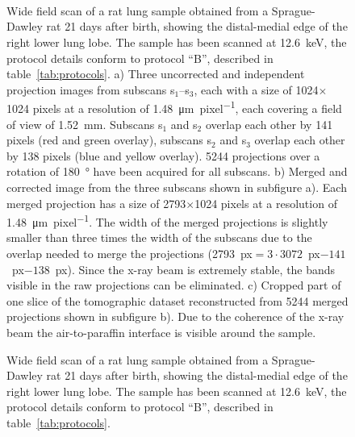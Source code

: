 \ifiucr
	\begin{figure}%
		\caption{Wide field scan of a rat lung sample obtained from a Sprague-Dawley rat 21 days after birth, showing the distal-medial edge of the right lower lung lobe. The sample has been scanned at \SI{12.6}{\kilo\electronvolt}, the protocol details conform to protocol ``B'', described in table~\ref{tab:protocols}. %
		a) Three uncorrected and independent projection images from subscans s$_1$--s$_3$, each with a size of 1024\(\times\)1024 pixels at a resolution of \SI{1.48}{\micro\meter\per pixel}, each covering a field of view of \SI{1.52}{\milli\meter}. Subscans s$_1$ and s$_2$ overlap each other by 141 pixels (red and green overlay), subscans s$_2$ and s$_3$ overlap each other by 138 pixels (blue and yellow overlay). 5244 projections  over a rotation of \SI{180}{\degree} have been acquired for all subscans. %
		b) Merged and corrected image from the three subscans shown in subfigure a). Each merged projection has a size of 2793\(\times\)1024 pixels at a resolution of \SI{1.48}{\micro\meter\per pixel}. The width of the merged projections is slightly smaller than three times the width of the subscans due to the overlap needed to merge the projections (2793~px$=3\cdot3072$~px$-141$~px$-138$~px). Since the x-ray beam is extremely stable, the bands visible in the raw projections can be eliminated. %
		c) Cropped part of one slice of the tomographic dataset reconstructed from 5244 merged projections shown in subfigure b). Due to the coherence of the x-ray beam the air-to-paraffin interface is visible around the sample.%
		}%
		\label{fig:wide field scan results}%
		\\%
		\\%
		\\%
	\end{figure}%
\else
	\begin{figure}[htp]
		
		\caption{Wide field scan of a rat lung sample obtained from a Sprague-Dawley rat 21 days after birth, showing the distal-medial edge of the right lower lung lobe. The sample has been scanned at \SI{12.6}{\kilo\electronvolt}, the protocol details conform to protocol ``B'', described in table~\ref{tab:protocols}.}%
		\label{fig:wide field scan results}%
	\end{figure}
\fi

